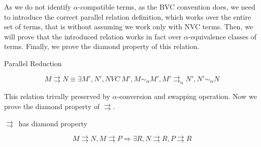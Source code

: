 \documentclass{article}
\newcommand{\alp}{\ensuremath{\alpha}}
\newcommand{\alpsym}{\ensuremath{\sim_\alpha}}
\newcommand{\p}{\ensuremath{\rightrightarrows}}
\newcommand{\pn}{\ensuremath{\rightrightarrows_n}}
\begin{document}
As we do not identify \alp-compatible terms, as the BVC convention does, we need to introduce the correct parallel relation definition, which works over the entire set of terms, that is without assuming we work only with NVC terms. Then, we will prove that the introduced relation works in fact over \alp-equivalence classes of terms. Finally, we prove the diamond property of this relation.

\begin{definition}{Parallel Reduction}

\[ M \p N \equiv \exists M',N', NVC\ M', M \alpsym M', M' \pn N' , N' \alpsym N \]

\begin{center}
\end{center}

\end{definition}

This relation trivally preserved by \alp-conversion and swapping operation. Now we prove the diamond property of \p.

\begin{theorem}{\p\ has diamond property}

  \begin{minipage}{0.7\linewidth}
  \[ M \p N, M \p P \Rightarrow \exists R, N \p R, P \p R \]
\end{minipage}
  \begin{minipage}{0.3\linewidth}
\end{minipage}

\end{theorem}
\end{document}
